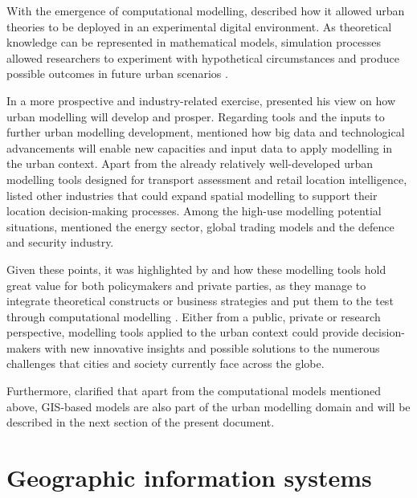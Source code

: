 \documentclass[12pt, a4paper]{report}
\begin{document}
With the emergence of computational modelling, \cite{battyUrbanModeling2009a} described how it allowed urban theories to be deployed in an experimental digital environment. As theoretical knowledge can be represented in mathematical models, simulation processes allowed researchers to experiment with hypothetical circumstances and produce possible outcomes in future urban scenarios \citep{battyUrbanModeling2009a}.


In a more prospective and industry-related exercise, \cite{wilsonFutureUrbanModelling2018} presented his view on how urban modelling will develop and prosper. Regarding tools and the inputs to further urban modelling development, \cite{wilsonFutureUrbanModelling2018} mentioned how big data and technological advancements will enable new capacities and input data to apply modelling in the urban context. Apart from the already relatively well-developed urban modelling tools designed for transport assessment and retail location intelligence, \cite{wilsonFutureUrbanModelling2018} listed other industries that could expand spatial modelling to support their location decision-making processes. Among the high-use modelling potential situations, \cite{wilsonFutureUrbanModelling2018} mentioned the energy sector, global trading models and the defence and security industry.


Given these points, it was highlighted by \cite{battyUrbanModeling2009a} and \cite{wilsonFutureUrbanModelling2018} how these modelling tools hold great value for both policymakers and private parties, as they manage to integrate theoretical constructs or business strategies and put them to the test through computational modelling \citep{battyUrbanModeling2009a}. Either from a public, private or research perspective, modelling tools applied to the urban context could provide decision-makers with new innovative insights and possible solutions to the numerous challenges that cities and society currently face across the globe.

Furthermore, \cite{battyUrbanModeling2009a} clarified that apart from the computational models mentioned above, GIS-based models are also part of the urban modelling domain and will be described in the next section of the present document.



\section{Geographic information systems}
\end{document}
